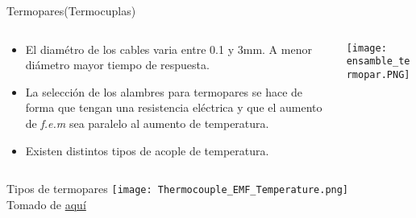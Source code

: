 \documentclass[aspectratio=169]{beamer}
\begin{document}
\begin{frame}{Termopares(Termocuplas)}
    \begin{columns}[c, onlytextwidth]
        \begin{column}{0.45\textwidth}
            \begin{itemize}
                \item El diamétro de los cables varia entre 0.1 y 3mm. A menor diámetro mayor tiempo de respuesta. 
                \item La selección de los alambres para termopares se hace de forma que tengan una resistencia eléctrica y que el aumento de \textit{f.e.m} sea paralelo al aumento de temperatura.
                \item Existen distintos tipos de acople de temperatura.
                
            \end{itemize}
        \end{column}
        \begin{column}{0.5\textwidth}
            \texttt{[image: ensamble\_termopar.PNG]}
            \\ \cite{Fraden_2016}
        \end{column}
    \end{columns}
\end{frame}
\begin{frame}{Tipos de termopares}
\centering
    \texttt{[image: Thermocouple\_EMF\_Temperature.png]}
     \\ \tiny{Tomado de \href{https://www.akcp.com/blog/what-is-a-k-type-thermocouple/}{aquí}}
\end{frame}
\end{document}
